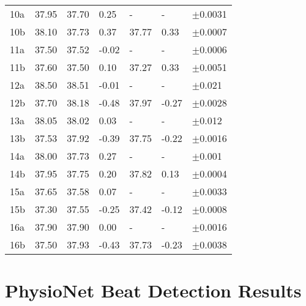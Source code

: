 \begin{longtable}{|P{1.4cm} | P{1.4cm} || P{1.6cm} |P{1.2cm}| |P{1.6cm} |P{1.2cm}||P{2cm}|}
10a	&	37.95	&	37.70 	&	0.25	&	-		&	-		&	$\pm$0.0031\\
10b	&	38.10	&	37.73 	&	0.37	&	37.77	&	0.33	&	$\pm$0.0007\\
11a	&	37.50	&	37.52 	&	-0.02	&	-		&	-		&	$\pm$0.0006\\
11b	&	37.60	&	37.50 	&	0.10	&	37.27	&	0.33	&	$\pm$0.0051\\
12a	&	38.50	&	38.51 	&	-0.01	&	-		&	-		&	$\pm$0.021\\
12b	&	37.70	&	38.18 	&	-0.48	&	37.97	&	-0.27	&	$\pm$0.0028\\
13a	&	38.05	&	38.02 	&	0.03	&	-		&	-		&	$\pm$0.012\\
13b	&	37.53	&	37.92 	&	-0.39	&	37.75	&	-0.22	&	$\pm$0.0016\\
14a	&	38.00	&	37.73 	&	0.27	&	-		&	-		&	$\pm$0.001\\
14b	&	37.95	&	37.75 	&	0.20	&	37.82	&	0.13	&	$\pm$0.0004\\
15a	&	37.65	&	37.58 	&	0.07	&	-		&	-		&	$\pm$0.0033\\
15b	&	37.30	&	37.55 	&	-0.25	&	37.42	&	-0.12	&	$\pm$0.0008\\
16a	&	37.90	&	37.90 	&	0.00	&	-		&	-		&	$\pm$0.0016\\
16b	&	37.50	&	37.93 	&	-0.43	&	37.73	&	-0.23	&	$\pm$0.0038\\
\hline
\end{longtable}



\section{PhysioNet Beat Detection Results}
\label{sec:PhysioNet Beat Detection Results}


